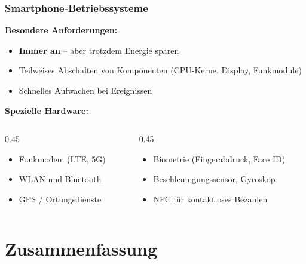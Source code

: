 \documentclass[aspectratio=169]{beamer}
\begin{document}
\begin{frame}
  \frametitle{Smartphone-Betriebssysteme}
  \textbf{Besondere Anforderungen:}
  \begin{itemize}
    \item \textbf{Immer an} -- aber trotzdem Energie sparen
    \item Teilweises Abschalten von Komponenten (CPU-Kerne, Display, Funkmodule)
    \item Schnelles Aufwachen bei Ereignissen
  \end{itemize}
  \vspace{5mm}
  \textbf{Spezielle Hardware:}
  \begin{columns}[T]
    \begin{column}{0.45\textwidth}
      \begin{itemize}
        \item Funkmodem (LTE, 5G)
        \item WLAN und Bluetooth
        \item GPS / Ortungsdienste
      \end{itemize}
    \end{column}
    \begin{column}{0.45\textwidth}
      \begin{itemize}
        \item Biometrie (Fingerabdruck, Face ID)
        \item Beschleunigungssensor, Gyroskop
        \item NFC für kontaktloses Bezahlen
      \end{itemize}
    \end{column}
  \end{columns}
\end{frame}

\section{Zusammenfassung}
\end{document}

